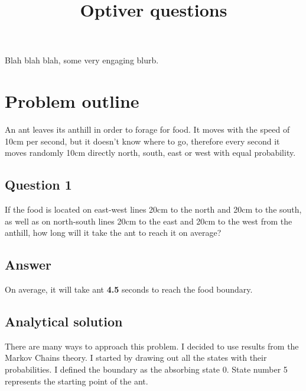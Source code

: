 \documentclass{article}
\title{Optiver questions}
\begin{document}
\noindent Blah blah blah, some very engaging blurb.

\section{Problem outline}
An ant leaves its anthill in order to forage for food. It moves with the speed of 10cm per second, but it doesn't know where to go, therefore every second it moves randomly 10cm directly north, south, east or west with equal probability.

\subsection{Question 1}
If the food is located on east-west lines 20cm to the north and 20cm to the south, as well as on north-south lines 20cm to the east and 20cm to the west from the anthill, how long will it take the ant to reach it on average?

\subsection{Answer}
On average, it will take ant \textbf{4.5} seconds to reach the food boundary.

\subsection{Analytical solution}
There are many ways to approach this problem. I decided to use results from the Markov Chains theory. I started by drawing out all the states with their probabilities. I defined the boundary as the absorbing state 0. State number 5 represents the starting point of the ant. 
\end{document}
